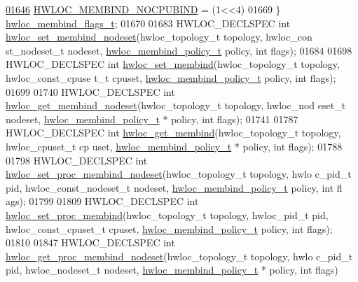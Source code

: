 \begin{DoxyCode}
\hypertarget{a00033_source_l01646}{}\hyperlink{a00050_ggab00475fd98815bf4fb9aaf752030e7d2aad6b9eaf2ee324ca58dc8f58094b9997}{01646}   \hyperlink{a00050_ggab00475fd98815bf4fb9aaf752030e7d2aad6b9eaf2ee324ca58dc8f58094b9997}{HWLOC_MEMBIND_NOCPUBIND} =     (1<<4)  
01669 \} \hyperlink{a00050_gab00475fd98815bf4fb9aaf752030e7d2}{hwloc_membind_flags_t};
01670 
01683 HWLOC\_DECLSPEC \textcolor{keywordtype}{int} \hyperlink{a00050_ga747962cbb16fd12ad6d126011c734a27}{hwloc_set_membind_nodeset}(hwloc\_topology\_t topology, hwloc\_con
      st\_nodeset\_t nodeset, \hyperlink{a00050_gac9764f79505775d06407b40f5e4661e8}{hwloc_membind_policy_t} policy, \textcolor{keywordtype}{int} flags);
01684 
01698 HWLOC\_DECLSPEC \textcolor{keywordtype}{int} \hyperlink{a00050_ga8b6d1d90227aff8e44ef26bc1f8a8f95}{hwloc_set_membind}(hwloc\_topology\_t topology, hwloc\_const\_cpuse
      t\_t cpuset, \hyperlink{a00050_gac9764f79505775d06407b40f5e4661e8}{hwloc_membind_policy_t} policy, \textcolor{keywordtype}{int} flags);
01699 
01740 HWLOC\_DECLSPEC \textcolor{keywordtype}{int} \hyperlink{a00050_ga7b46a4ca0b2db9723ca73b0c148ccd93}{hwloc_get_membind_nodeset}(hwloc\_topology\_t topology, hwloc\_nod
      eset\_t nodeset, \hyperlink{a00050_gac9764f79505775d06407b40f5e4661e8}{hwloc_membind_policy_t} * policy, \textcolor{keywordtype}{int} flags);
01741 
01787 HWLOC\_DECLSPEC \textcolor{keywordtype}{int} \hyperlink{a00050_gab07aedba1119f99130e5f0b796b7d8a5}{hwloc_get_membind}(hwloc\_topology\_t topology, hwloc\_cpuset\_t cp
      uset, \hyperlink{a00050_gac9764f79505775d06407b40f5e4661e8}{hwloc_membind_policy_t} * policy, \textcolor{keywordtype}{int} flags);
01788 
01798 HWLOC\_DECLSPEC \textcolor{keywordtype}{int} \hyperlink{a00050_gaf10d18cd4703ec980d7440a1c23fa07f}{hwloc_set_proc_membind_nodeset}(hwloc\_topology\_t topology, hwlo
      c\_pid\_t pid, hwloc\_const\_nodeset\_t nodeset, \hyperlink{a00050_gac9764f79505775d06407b40f5e4661e8}{hwloc_membind_policy_t} policy, \textcolor{keywordtype}{int} fl
      ags);
01799 
01809 HWLOC\_DECLSPEC \textcolor{keywordtype}{int} \hyperlink{a00050_gac63c4517e71b3f0d41b3dee3e83dc55c}{hwloc_set_proc_membind}(hwloc\_topology\_t topology, hwloc\_pid\_t 
      pid, hwloc\_const\_cpuset\_t cpuset, \hyperlink{a00050_gac9764f79505775d06407b40f5e4661e8}{hwloc_membind_policy_t} policy, \textcolor{keywordtype}{int} flags);
01810 
01847 HWLOC\_DECLSPEC \textcolor{keywordtype}{int} \hyperlink{a00050_ga22074ed072e1039f74f17f7b16e9e39d}{hwloc_get_proc_membind_nodeset}(hwloc\_topology\_t topology, hwlo
      c\_pid\_t pid, hwloc\_nodeset\_t nodeset, \hyperlink{a00050_gac9764f79505775d06407b40f5e4661e8}{hwloc_membind_policy_t} * policy, \textcolor{keywordtype}{int} flags)

\end{DoxyCode}
